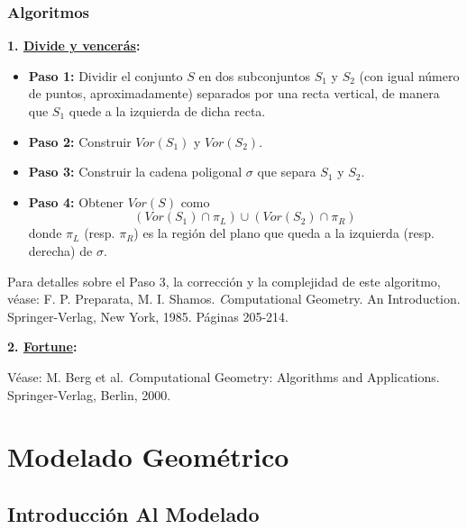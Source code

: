 \documentclass[ebook,oneside]{memoir}
\begin{document}
\subsection{Algoritmos}

\textbf{1. \underline{Divide y vencer\'{a}s}:}

\begin{itemize}

  \item \textbf{Paso 1:} Dividir el conjunto $S$ en dos subconjuntos $S_1$ y $S_2$ (con igual n\'{u}mero de puntos, aproximadamente) se\-pa\-ra\-dos por una recta vertical, de manera que $S_1$ quede a la izquierda de dicha recta.

  \item \textbf{Paso 2:} Construir $Vor(S_1)$ y $Vor(S_2)$.

  \item \textbf{Paso 3:} Construir la cadena poligonal $\sigma$ que separa $S_1$ y $S_2$.

  \item \textbf{Paso 4:} Obtener $Vor(S)$ como $$(Vor(S_1)\cap\pi_L)\cup (Vor(S_2)\cap\pi_R)$$ donde $\pi_L$ (resp. $\pi_R$) es la regi\'{o}n del plano que queda a la izquierda (resp. derecha) de $\sigma$.

\end{itemize}

 Para detalles sobre el Paso 3, la correcci\'{o}n y la
complejidad de este algoritmo, v\'{e}ase: {\small F. P. Preparata, M. I.
Shamos}. {\textit Computational Geometry. An Introduction.}
Springer-Verlag, New York, 1985. P\'{a}ginas 205-214.

\vspace{0.3cm}

\textbf{2. \underline{Fortune}:}

\vspace{0.3cm}

V\'{e}ase: {\small M. Berg et al.} {\textit Computational
Geometry: Algorithms and Applications.} Springer-Verlag, Berlin,
2000.

\chapter{Modelado Geométrico}


\section{Introducción Al Modelado}
\end{document}
